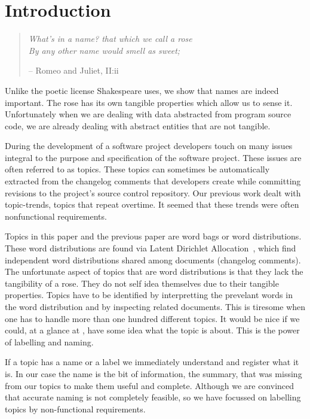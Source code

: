 \documentclass[10pt, conference, compsocconf]{IEEEtran}
\begin{document}
\section{Introduction}
\begin{quote}
	\emph{What's in a name? that which we call a rose\\
	By any other name would smell as sweet;}
	\begin{flushright} -- Romeo and Juliet, II:ii\end{flushright}
\end{quote}

Unlike the poetic license Shakespeare uses, we show that names are indeed important. The rose has its own tangible properties which allow us to sense it. Unfortunately when we are dealing with data abstracted from program source code, we are already dealing with abstract entities that are not tangible.

During the development of a software project developers touch on many issues integral to the purpose and specification of the software project. These issues are often referred to as topics. These topics can sometimes be automatically extracted from the changelog comments that developers create while committing revisions to the project's source control repository. Our previous work dealt with topic-trends, topics that repeat overtime. It seemed that these trends were often nonfunctional requirements. 

Topics in this paper and the previous paper are word bags or word distributions. These word distributions are found via Latent Dirichlet Allocation~\cite{Blei2003}, which find independent word distributions shared among documents (changelog comments). The unfortunate aspect of topics that are word distributions is that they lack the tangibility of a rose. They do not self idea themselves due to their tangible properties. Topics have to be identified by interpretting the prevelant words in the word distribution and by inspecting related documents. This is tiresome when one has to handle more than one hundred different topics. It would be nice if we could, at a glance at , have some idea what the topic is about. This is the power of labelling and naming.

If a topic has a name or a label we immediately understand and register what it is. In our case the name is the bit of information, the summary, that was missing from our topics to make them useful and complete. Although we are convinced that accurate naming is not completely feasible, so we have focussed on labelling topics by non-functional requirements.
\end{document}
